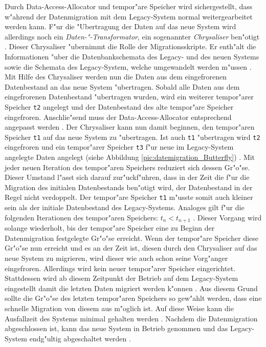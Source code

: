 Durch Data-Access-Allocator und tempor"are Speicher wird sichergestellt, dass w"ahrend der Datenmigration mit dem Legacy-System normal weitergearbeitet werden kann. F"ur die "Ubertragung der Daten auf das neue System wird allerdings noch ein \textit{Daten-"-Transformator}, ein sogenannter \textit{Chrysaliser} ben"otigt \citep[S.~202]{wuLawlessBisbal-1997}. Dieser Chrysaliser "ubernimmt die Rolle der Migrationsskripte. Er enth"alt die Informationen "uber die Datenbankschemata des Legacy- und des neuen Systems sowie die Schemata des Legacy-System, welche umgewandelt werden m"ussen \citep[S.~202]{wuLawlessBisbal-1997}. 
\lb
Mit Hilfe des Chrysaliser werden nun die Daten aus dem eingefrorenen Datenbestand an das neue System "ubertragen. Sobald alle Daten aus dem eingefrorenen Datenbestand "ubertragen wurden, wird ein weiterer tempor"arer Speicher \texttt{t2} angelegt und der Datenbestand des alte tempor"are Speicher eingefroren. Anschlie"send muss der Data-Access-Allocator entsprechend angepasst werden \citep[S.~202]{wuLawlessBisbal-1997}. Der Chrysaliser kann nun damit beginnen, den tempor"aren Speicher \texttt{t1} auf das neue System zu "ubertragen. Ist auch \texttt{t1} "ubertragen wird \texttt{t2} eingefroren und ein tempor"arer Speicher \texttt{t3} f"ur neue im Legacy-System angelegte Daten angelegt (siehe Abbildung \ref{pic:datemigration_Butterfly}) \citep[S.~202]{wuLawlessBisbal-1997}. Mit jeder neuen Iteration des tempor"aren Speichers reduziert sich dessen Gr"o"se. Dieser Umstand l"asst sich darauf zur"uckf"uhren, dass in der Zeit die f"ur die Migration des initialen Datenbestands ben"otigt wird, der Datenbestand in der Regel nicht verdoppelt. Der tempor"are Speicher \texttt{t1} m"usste somit auch kleiner sein als der initiale Datenbestand des Legacy-Systems. Analoges gilt f"ur die folgenden Iterationen des tempor"aren Speichers: \textbf{$t_n <t_{n+1}$} \citep[S.~202]{wuLawlessBisbal-1997}. 
\lb
Dieser Vorgang wird solange wiederholt, bis der tempor"are Speicher eine zu Beginn der Datenmigration festgelegte Gr"o"se erreicht. Wenn der tempor"are Speicher diese Gr"o"se nun erreicht und es an der Zeit ist, diesen durch den Chrysaliser auf das neue System zu migrieren, wird dieser wie auch schon seine Vorg"anger eingefroren. Allerdings wird kein neuer tempor"arer Speicher eingerichtet. Stattdessen wird ab diesem Zeitpunkt der Betrieb auf dem Legacy-System eingestellt damit die letzten Daten migriert werden k"onnen \citep[S.~202]{wuLawlessBisbal-1997}. Aus diesem Grund sollte die Gr"o"se des letzten tempor"aren Speichers so gew"ahlt werden, dass eine schnelle Migration von diesem aus m"oglich ist. Auf diese Weise kann die Ausfallzeit des Systems minimal gehalten werden \citep[S.~202]{wuLawlessBisbal-1997}. Nachdem die Datenmigration abgeschlossen ist, kann das neue System in Betrieb genommen und das Legacy-System endg"ultig abgeschaltet werden \citep[S.~204]{wuLawlessBisbal-1997}.
